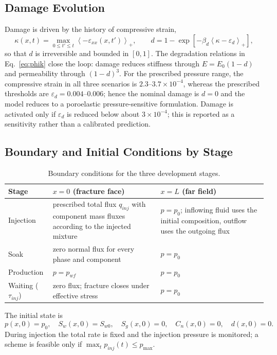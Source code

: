 \subsection{Damage Evolution}

Damage is driven by the history of compressive strain,
\begin{equation}
\kappa(x,t)=\max_{0\le t'\le t}\left\langle-\varepsilon_{xx}(x,t')\right\rangle_+,
\qquad
d=1-\exp\left[-\beta_d\left\langle\kappa-\varepsilon_d\right\rangle_+\right],
\label{eq:damage}
\end{equation}
so that $d$ is irreversible and bounded in $[0,1]$. The degradation relations
in Eq.~\eqref{eq:phik} close the loop: damage reduces stiffness through
$E=E_0(1-d)$ and permeability through $(1-d)^3$. For the prescribed pressure
range, the compressive strain in all three scenarios is
$2.3$--$3.7\times10^{-4}$, whereas the prescribed thresholds are
$\varepsilon_d=0.004$--$0.006$; hence the nominal damage is $d=0$ and the
model reduces to a poroelastic pressure-sensitive formulation. Damage is
activated only if $\varepsilon_d$ is reduced below about
$3\times10^{-4}$; this is reported as a sensitivity rather than a calibrated
prediction.

\subsection{Boundary and Initial Conditions by Stage}

\begin{table}[h!t]
\centering
\caption{Boundary conditions for the three development stages.}
\label{tbl:bc}
\small
\begin{tabular}{p{2.2cm}p{4.6cm}p{4.2cm}}
\toprule[1.5pt]
Stage & $x=0$ (fracture face) & $x=L$ (far field)\\
\midrule[1pt]
Injection & prescribed total flux $q_{inj}$ with component mass fluxes
according to the injected mixture & $p=p_0$; inflowing fluid uses the initial
composition, outflow uses the outgoing flux\\
Soak & zero normal flux for every phase and component & $p=p_0$\\
Production & $p=p_{wf}$ & $p=p_0$\\
Waiting ($\tau_{inj}$) & zero flux; fracture closes under effective stress &
$p=p_0$\\
\bottomrule[1.5pt]
\end{tabular}
\end{table}

The initial state is
\begin{equation}
p(x,0)=p_0,\quad S_w(x,0)=S_{w0},\quad S_g(x,0)=0,\quad
C_n(x,0)=0,\quad d(x,0)=0 .
\label{eq:ic}
\end{equation}
During injection the total rate is fixed and the injection pressure is
monitored; a scheme is feasible only if $\max_t p_{inj}(t)\le p_{\max}$.

